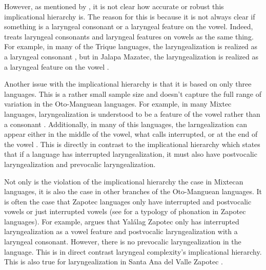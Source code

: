 However, as mentioned by \citet{frazierPhoneticsYucatecMaya2013}, it is not clear how accurate or robust this implicational hierarchy is. The reason for this is because it is not always clear if something is a laryngeal consonant or a laryngeal feature on the vowel. Indeed, \citet{silvermanLaryngealComplexityOtomanguean1997,silvermanPhasingRecoverability1997} treats laryngeal consonants and laryngeal features on vowels as the same thing. For example, in many of the Trique languages, the laryngealization is realized as a laryngeal consonant \citep{dicanioPhoneticsPhonologySan2008,dicanioItunyosoTrique2010,dicanioCoarticulationToneGlottal2012,dicanioPhoneticsFortisLenis2012,dicanioCueWeightPerception2014,dicanioGlottalTogglingItunyoso2020,elliottChicahuaxtlaTriqui2016,hollenbachPhonologyMorphologyTone1984}, but in Jalapa Mazatec, the laryngealization is realized as a laryngeal feature on the vowel \citep{kirkQuantifyingAcousticProperties1993,garellekAcousticConsequencesPhonation2011}. 

Another issue with the implicational hierarchy is that it is based on only three languages. This is a rather small sample size and doesn't capture the full range of variation in the Oto-Manguean languages. For example, in many Mixtec languages, laryngealization is understood to be a feature of the vowel rather than a consonant \citep[e.g.,][]{cortesSanSebastianMonte2023,eischensTonePhonationPhonologyPhonetics2022,gerfenPhonologyPhoneticsCoatzospan1999,gerfenProductionPerceptionLaryngealized2005}. Additionally, in many of this languages, the larngealization can appear either in the middle of the vowel, what \citet{silvermanLaryngealComplexityOtomanguean1997} calls interrupted, or at the end of the vowel \citep[e.g.,][]{cortesSanSebastianMonte2023,eischensTonePhonationPhonologyPhonetics2022}. This is directly in contrast to the implicational hierarchy which states that if a language has interrupted laryngealization, it must also have postvocalic laryngealization and prevocalic laryngealization.

Not only is the violation of the implicational hierarchy the case in Mixtecan languages, it is also the case in other branches of the Oto-Manguean languages. It is often the case that Zapotec languages only have interrupted and postvocalic vowels or just interrupted vowels (see \cite{ariza-garciaPhonationTypesTones2018} for a typology of phonation in Zapotec languages). For example, \citet{avelinobecerraTopicsYalalagZapotec2004,avelinoAcousticElectroglottographicAnalyses2010} argues that Yalálag Zapotec only has interrupted laryngealization as a vowel feature and postvocalic laryngealization with a laryngeal consonant. However, there is no prevocalic laryngealization in the language. This is in direct contrast laryngeal complexity's implicational hierarchy. This is also true for laryngealization in Santa Ana del Valle Zapotec \citep{espositoSantaAnaValle2004,espositoAcousticElectroglottographicStudy2012}.


